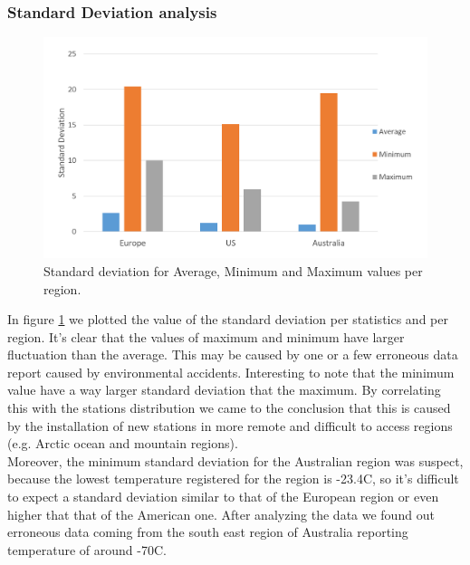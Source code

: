 \documentclass{vldb}
\begin{document}
\subsubsection{Standard Deviation analysis}
\begin{figure}[tbh]
\includegraphics[width=1\linewidth]{stdev}
\caption{Standard deviation for Average, Minimum and Maximum values per region.}
\label{fig:stdev}
\end{figure}
In figure \ref{fig:stdev} we plotted the value of the standard deviation per statistics and per region. It's clear that the values of maximum and minimum have larger fluctuation than the average. This may be caused by one or a few erroneous data report caused by environmental accidents. Interesting to note that the minimum value have a way larger standard deviation that the maximum. By correlating this with the stations distribution we came to the conclusion that this is caused by the installation of new stations in more remote and difficult to access regions (e.g. Arctic ocean and mountain regions). \\
Moreover, the minimum standard deviation for the Australian region was suspect, because the lowest temperature registered for the region is -23.4\degree C\cite{ausTemp}, so it's difficult to expect a standard deviation similar to that of the European region or even higher that that of the American one. After analyzing the data we found out erroneous data coming from the south east region of Australia reporting temperature of around -70\degree C.

\FloatBarrier
\end{document}
